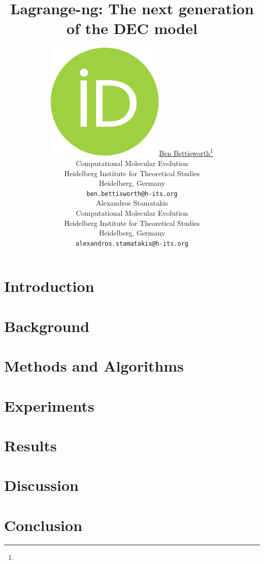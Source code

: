 \documentclass{article}
\title{Lagrange-ng: The next generation of the DEC model}
\author{\href{https://orcid.org/0000-0002-9130-6878}{\includegraphics[scale=0.06]{orcid.pdf}\hspace{1mm}Ben Bettisworth}\thanks{} \\
	Computational Molecular Evolution\\
	Heidelberg Institute for Theoretical Studies\\
	Heidelberg, Germany \\
	\texttt{ben.bettisworth@h-its.org} \\
	\And
    Alexandros Stamatakis\\
    Computational Molecular Evolution\\
	Heidelberg Institute for Theoretical Studies\\
	Heidelberg, Germany\\
	\texttt{alexandros.stamatakis@h-its.org} \\
}
\begin{document}
\maketitle


\begin{abstract}
\end{abstract}




\section{Introduction}

\section{Background}

\section{Methods and Algorithms}
\label{sec:methods}

\section{Experiments}
\label{sec:experiments}

\section{Results}
\label{sec:experiments}

\section{Discussion}
\label{sec:discussion}

\section{Conclusion}
\label{sec:conclusion}


 


\end{document}

